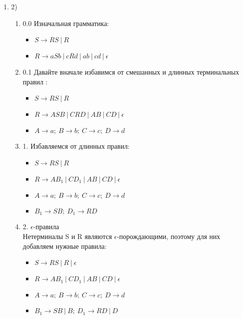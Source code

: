 \documentclass[12pt]{article}
\newenvironment{MyList}[1][4pt]{
  \begin{enumerate}[1.]
  \setlength{\parskip}{0pt}
  \setlength{\itemsep}{#1}
}{       
  \end{enumerate}
}
\begin{document}
\pagestyle{fancy}
\begin{MyList}[8pt]
	
 \item[2)] 
	\begin{MyList}[8pt]
	 \item[0.0] Изначальная грамматика: \\
		\begin{itemize}
			\item $S \to R S \ | \ R$
			\item $R \to a S b \ | \ c R d \ | \ a b \ | \ c d \ | \ \epsilon$
		\end{itemize}
	 \item[0.1] Давайте вначале избавимся от смешанных и длинных терминальных правил : \\
	 	\begin{itemize}
	 		\item $S \to R S \ | \ R$
	 		\item $R \to A S B \ | \ C R D \ | \ A B \ | \ C D \ | \ \epsilon$
	 		\item $A \to a; \ B \to b; \ C \to c; \ D \to d$
	 	\end{itemize}
 	\item[1.] Избавляемся от длинных правил: \\
 		\begin{itemize}
 			\item $S \to R S \ | \ R$
 			\item $R \to A B_1 \ | \ C D_1 \ | \ A B \ | \ C D \ | \ \epsilon$
 			\item $A \to a; \ B \to b; \ C \to c; \ D \to d$
 			\item $B_1 \to S B; \ D_1 \to R D$
 		\end{itemize}
 	\item[2.] $\epsilon$-правила \\
 		Нетерминалы S и R являются $\epsilon$-порождающими, поэтому для них добавляем нужные правила: \\
		\begin{itemize}
			\item $S \to R S \ | \ R \ | \ \epsilon$
			\item $R \to A B_1 \ | \ C D_1 \ | \ A B \ | \ C D \ | \ \epsilon$
			\item $A \to a; \ B \to b; \ C \to c; \ D \to d$
			\item $B_1 \to S B \ | \ B; \ D_1 \to R D \ | \ D$
			

\end{itemize}
\end{MyList}
\end{MyList}
\end{document}
